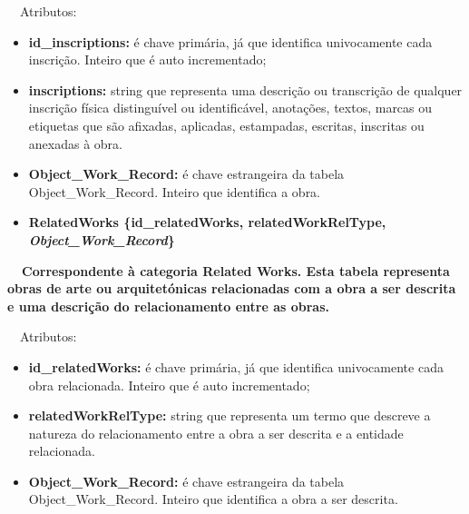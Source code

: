 \documentclass[letterpaper]{article}
\newcommand\textstyleStrongEmphasis[1]{\textbf{#1}}
\newcommand\liststyleLi{%
\renewcommand\labelitemi{{\textbullet}}
\renewcommand\labelitemii{[27A2?]}
\renewcommand\labelitemiii{{\textbullet}}
\renewcommand\labelitemiv{{\textbullet}}
}
\newcommand\liststyleLvi{%
\renewcommand\labelitemi{[27A2?]}
\renewcommand\labelitemii{[27A2?]}
\renewcommand\labelitemiii{[27A2?]}
\renewcommand\labelitemiv{[27A2?]}
}
\begin{document}
\bigskip

{
\ \ Atributos:}

\liststyleLvi
\begin{itemize}
\item {
\textbf{id\_}\textbf{inscriptions}\textbf{:} \'e chave prim\'aria, j\'a
que identifica univocamente cada inscri\c{c}\~ao. Inteiro que \'e auto
incrementado;}
\item {
\textbf{inscriptions:} string que representa uma descri\c{c}\~ao ou
transcri\c{c}\~ao de qualquer inscri\c{c}\~ao f\'isica distingu\'ivel
ou identific\'avel, anota\c{c}\~oes, textos, marcas ou etiquetas que
s\~ao afixadas, aplicadas, estampadas, escritas, inscritas ou anexadas
\`a obra.}
\item {
\textbf{Object\_Work\_Record:}\textit{ }\'e chave estrangeira da tabela
Object\_Work\_Record. Inteiro que identifica a obra.}
\end{itemize}

\bigskip

\liststyleLi
\begin{itemize}
\item {\bfseries
RelatedWorks\textmd{ \{}\textmd{id\_relatedWorks}\textmd{,
relatedWorkRelType, }\textmd{\textit{Object\_Work\_Record}}\textmd{\}}}
\end{itemize}
{\bfseries
\foreignlanguage{english}{\textmd{\ \ Correspondente \`a categoria
}}\textstyleStrongEmphasis{\foreignlanguage{english}{Related
Works}}\foreignlanguage{english}{\textmd{. Esta
}}\textstyleStrongEmphasis{\foreignlanguage{english}{\textmd{tabela}}}\foreignlanguage{english}{\textmd{
representa obras de arte ou arquitet\'onicas relacionadas com a obra a
ser descrita e uma descri\c{c}\~ao do relacionamento entre as obras.}}}


\bigskip

{
\ \ Atributos:}

\liststyleLvi
\begin{itemize}
\item {
\textbf{id\_}\textbf{relatedWorks}\textbf{:} \'e chave prim\'aria, j\'a
que identifica univocamente cada obra relacionada. Inteiro que \'e auto
incrementado;}
\item {
\textbf{relatedWorkRelType:} string que representa um termo que descreve
a natureza do relacionamento entre a obra a ser descrita e a entidade
relacionada.}
\item {
\textbf{Object\_Work\_Record:}\textit{ }\'e chave estrangeira da tabela
Object\_Work\_Record. Inteiro que identifica a obra a ser descrita.}
\end{itemize}
\end{document}
